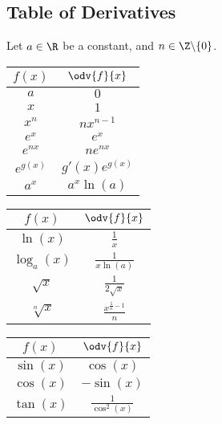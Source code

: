 \documentclass{article}
\renewcommand{\arraystretch}{1.5} %
\begin{document}
\subsection{Table of Derivatives}
Let \(a\in\R\) be a constant, and \(n\in\Z\backslash\{0\}\).
\begin{table}[H]
    \centering
    \renewcommand{\arraystretch}{2.5}
    \begin{tabular}[t]{c c}
        \(f(x)\)     & \(\odv{f}{x}\)    \\[1em]
        \midrule
        \(a\)        & \(0\)             \\
        \(x\)        & \(1\)             \\
        \(x^n\)      & \(n x^{n-1}\)     \\
        \(e^x\)      & \(e^x\)           \\
        \(e^{nx}\)   & \(ne^{nx}\)       \\
        \(e^{g(x)}\) & \(g'(x)e^{g(x)}\) \\
        \(a^x\)      & \(a^x \ln(a)\)
    \end{tabular}
    \quad
    \begin{tabular}[t]{c c}
        \(f(x)\)                   & \(\odv{f}{x}\)                  \\[1em]
        \midrule
        \(\ln{\left(x\right)}\)    & \(\frac{1}{x}\)                 \\
        \(\log_a{\left(x\right)}\) & \(\frac{1}{x \ln(a)}\)          \\
        \(\sqrt{x}\)               & \(\frac{1}{2 \sqrt{x}}\)        \\[0.5em]
        \(\sqrt[n]{x}\)            & \(\frac{x^{\frac{1}{n}-1}}{n}\)
    \end{tabular}
    \quad
    \begin{tabular}[t]{c c}
        \(f(x)\)                 & \(\odv{f}{x}\)                       \\[1em]
        \midrule
        \(\sin{\left(x\right)}\) & \(\cos{\left(x\right)}\)             \\
        \(\cos{\left(x\right)}\) & \(-\sin{\left(x\right)}\)            \\
        \(\tan{\left(x\right)}\) & \(\frac{1}{\cos^2{\left(x\right)}}\)
    \end{tabular}
\end{table}
\end{document}
